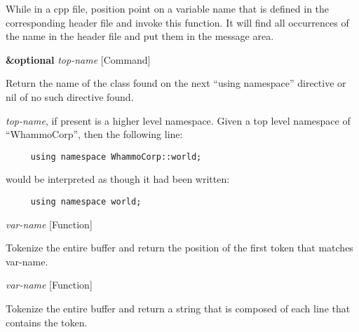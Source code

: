 \begin{doc-string}
While in a cpp file, position point on a variable name that is defined in the
corresponding header file and invoke this function.  It will find all occurrences of
the name in the header file and put them in the message area.
\end{doc-string}

\vspace{1em}
\noindent
{}
\usebox{\funcname}\textbf{\&optional} \emph{top-name}
 \hfill [Command]

\begin{doc-string}
Return the name of the class found on the next ``using namespace'' directive
or nil of no such directive found.

\emph{top-name}, if present is a higher level namespace.  Given a top level namespace
of ``WhammoCorp'', then the following line:

\small{\begin{verbatim}
     using namespace WhammoCorp::world;
\end{verbatim}}

would be interpreted as though it had been written:

\small{\begin{verbatim}
     using namespace world;
\end{verbatim}}
\end{doc-string}

\vspace{1em}
\noindent
{}
\usebox{\funcname}\emph{var-name}
 \hfill [Function]

\begin{doc-string}
Tokenize the entire buffer and return the position of the first token
that matches var-name.
\end{doc-string}

\vspace{1em}
\noindent
{}
\usebox{\funcname}\emph{var-name}
 \hfill [Function]

\begin{doc-string}
Tokenize the entire buffer and return a string that is composed of each
line that contains the token.
\end{doc-string}

